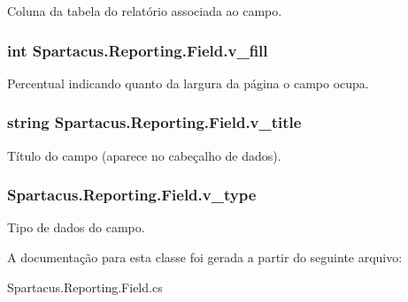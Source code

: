 Coluna da tabela do relatório associada ao campo. 

\hypertarget{classSpartacus_1_1Reporting_1_1Field_ae8b88bec5cb5519800c17ca5c415994a}{
\subsubsection[{v\+\_\+fill}]{\setlength{\rightskip}{0pt plus 5cm}int Spartacus.\+Reporting.\+Field.\+v\+\_\+fill}}\label{classSpartacus_1_1Reporting_1_1Field_ae8b88bec5cb5519800c17ca5c415994a}


Percentual indicando quanto da largura da página o campo ocupa. 

\hypertarget{classSpartacus_1_1Reporting_1_1Field_ad450139065a85c8b7fcf246512ed9a2d}{
\subsubsection[{v\+\_\+title}]{\setlength{\rightskip}{0pt plus 5cm}string Spartacus.\+Reporting.\+Field.\+v\+\_\+title}}\label{classSpartacus_1_1Reporting_1_1Field_ad450139065a85c8b7fcf246512ed9a2d}


Título do campo (aparece no cabeçalho de dados). 

\hypertarget{classSpartacus_1_1Reporting_1_1Field_a118afbb0d22ccc14aacd8d2b1a048707}{
\subsubsection[{v\+\_\+type}]{ Spartacus.\+Reporting.\+Field.\+v\+\_\+type}}\label{classSpartacus_1_1Reporting_1_1Field_a118afbb0d22ccc14aacd8d2b1a048707}


Tipo de dados do campo. 



A documentação para esta classe foi gerada a partir do seguinte arquivo\+:\begin{DoxyCompactItemize}
\item 
Spartacus.\+Reporting.\+Field.\+cs\end{DoxyCompactItemize}
